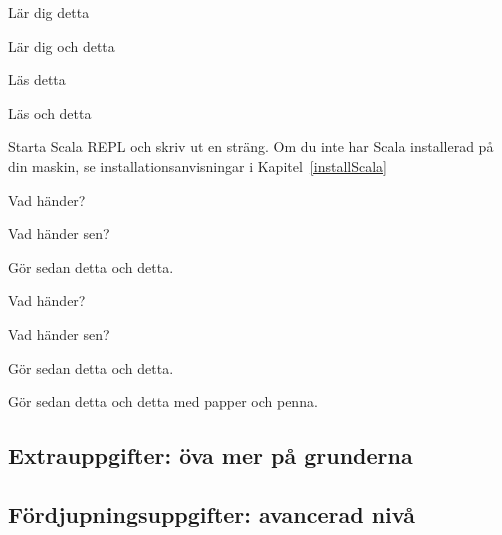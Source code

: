

\begin{Goals}
\item Lär dig detta
\item Lär dig och detta
\end{Goals}

\begin{Preparations}
\item Läs detta
\item Läs och detta
\end{Preparations}

\BasicTasks


\Task Starta Scala REPL och skriv ut en sträng. Om du inte har Scala installerad på din maskin, se installationsanvisningar i Kapitel~\ref{installScala}


\Subtask Vad händer?

\Subtask Vad händer sen?


\Task Gör sedan detta och detta. 

\Subtask Vad händer?

\Subtask Vad händer sen?

\Task Gör sedan detta och detta. 

\Task\Pen Gör sedan detta och detta med papper och penna.

\lipsum[7]

\subsection{Extrauppgifter: öva mer på grunderna}
\lipsum[2]


\subsection{Fördjupningsuppgifter: avancerad nivå}
\lipsum[2]